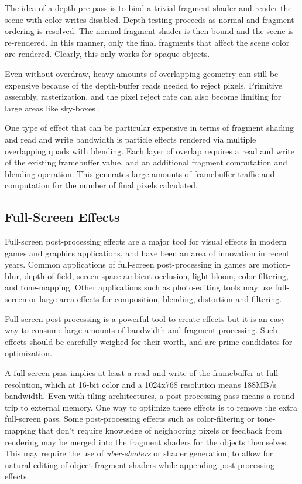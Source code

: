 The idea of a depth-pre-pass is to bind a trivial fragment shader and render
the scene with color writes disabled.  Depth testing proceeds as normal and
fragment ordering is resolved.  The normal fragment shader is then bound and
the scene is re-rendered.  In this manner, only the final fragments that affect
the scene color are rendered.  Clearly, this only works for opaque objects.

Even without overdraw, heavy amounts of overlapping geometry can still be
expensive because of the depth-buffer reads needed to reject pixels.  Primitive
assembly, rasterization, and the pixel reject rate can also become limiting for
large areas like sky-boxes \cite{Pranckevicius11a}.

One type of effect that can be particular expensive in terms of fragment
shading and read and write bandwidth is particle effects rendered via multiple
overlapping quads with blending.  Each layer of overlap requires a read and
write of the existing framebuffer value, and an additional fragment computation
and blending operation.  This generates large amounts of framebuffer traffic
and computation for the number of final pixels calculated.

\subsection {Full-Screen Effects}\label{Jon-McCaffrey-Full-Screen-Effects}
Full-screen post-processing effects are a major tool for visual effects in
modern games and graphics applications, and have been an area of innovation in
recent years.   Common applications of full-screen post-processing in games are
motion-blur, depth-of-field, screen-space ambient occlusion, light bloom, color
filtering, and tone-mapping.  Other applications such as photo-editing tools
may use full-screen or large-area effects for composition, blending, distortion
and filtering.

Full-screen post-processing is a powerful tool to create effects but it is an
easy way to consume large amounts of bandwidth and fragment processing.  Such
effects should be carefully weighed for their worth, and are prime candidates
for optimization.  

A full-screen pass implies at least a read and write of the framebuffer at full
resolution, which at 16-bit color and a 1024x768 resolution means 188MB/s
bandwidth.  Even with tiling architectures, a post-processing pass
means a round-trip to external memory.  One way to optimize these effects is to
remove the extra full-screen pass.  Some post-processing effects such as
color-filtering or tone-mapping that don't require knowledge of neighboring
pixels or feedback from rendering may be merged into the fragment shaders for
the objects themselves.  This may require the use of \textit{uber-shaders} or
shader generation, to allow for natural editing of object fragment shaders
while appending post-processing effects.


